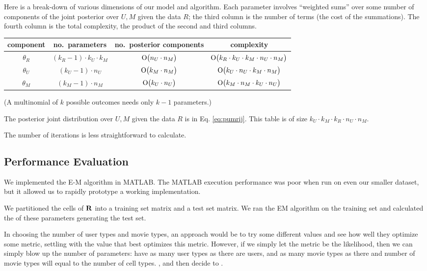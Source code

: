 \documentclass{article}
\begin{document}
Here is a break-down of various dimensions of our model and
algorithm. Each parameter involves ``weighted sums'' over some number
of components of the joint posterior over $U,M$ given the data $R$;
the third column is the number of terms (the cost of the
summations). The fourth column is the total complexity, the product of
the second and third columns.
\begin{center}
  \begin{tabular}{c|c|c|c}
    component & no.~parameters &
    no.~posterior components & complexity
    \\ \hline
    $\theta_R$ & $(k_R - 1) \cdot k_U \cdot k_M$ &
    $\operatorname{O}\bigl(n_U \cdot n_M\bigr)$ &
    $\operatorname{O}\bigl(k_R \cdot k_U \cdot k_M \cdot n_U \cdot n_M\bigr)$ \\
    $\theta_U$ & $(k_U - 1) \cdot n_U$ &
    $\operatorname{O}\bigl(k_M \cdot n_M\bigr)$ & $\operatorname{O}\bigl(k_U \cdot n_U \cdot k_M \cdot n_M\bigr)$ \\
    $\theta_M$ & $(k_M - 1) \cdot n_M$ &
    $\operatorname{O}\bigl(k_U \cdot n_U\bigr)$ & $\operatorname{O}\bigl(k_M \cdot n_M \cdot k_U \cdot n_U\bigr)$ \\
  \end{tabular}
\end{center}
(A multinomial of $k$ possible outcomes needs only $k-1$ parameters.)

The posterior joint distribution over $U,M$ given the data $R$ is in
Eq. \ref{eq:pumrij}. This table is of size $k_U \cdot k_M \cdot k_R
\cdot n_U \cdot n_M$.

 The number of iterations is less
straightforward to calculate.

\subsection{Performance Evaluation}

We implemented the E-M algorithm in MATLAB. The MATLAB execution
performance was poor when run on even our smaller dataset, but it
allowed us to rapidly prototype a working implementation.

We partitioned the cells of ${\bf R}$ into a training set matrix and a
test set matrix. We ran the EM algorithm on the training set and
calculated the  of these parameters generating the
test set.



In choosing the number of user types and movie types, an approach
would be to try some different values and see how well they optimize
some metric, settling with the value that best optimizes this
metric.  However, if we
simply let the metric be the likelihood, then we can simply blow up
the number of parameters: have as many user types as there are users,
and as many movie types as  there and number of movie types will equal to the
number of cell types. , and then decide to .
\end{document}
